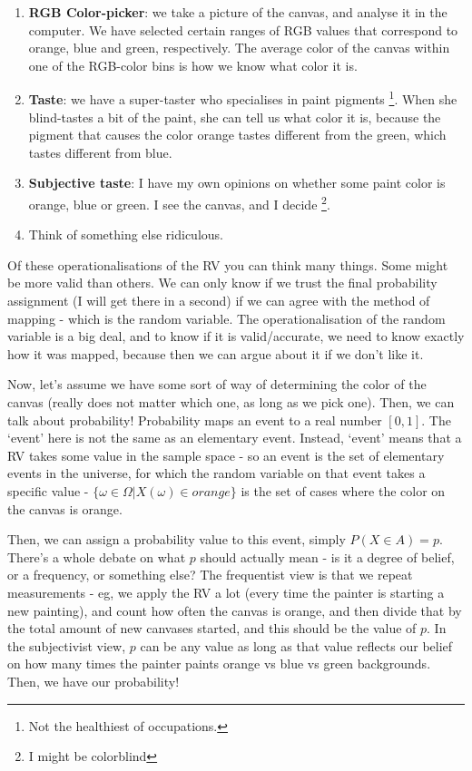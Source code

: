 \begin{enumerate}
\item \textbf{RGB Color-picker}: we take a picture of the canvas, and analyse it in the computer. We have selected certain ranges of RGB values that correspond to orange, blue and green, respectively. The average color of the canvas within one of the RGB-color bins is how we know what color it is.
\item \textbf{Taste}: we have a super-taster who specialises in paint pigments \footnote{Not the healthiest of occupations.}. When she blind-tastes a bit of the paint, she can tell us what color it is, because the pigment that causes the color orange tastes different from the green, which tastes different from blue.
\item \textbf{Subjective taste}: I have my own opinions on whether some paint color is orange, blue or green. I see the canvas, and I decide \footnote{I might be colorblind}.
\item Think of something else ridiculous.
\end{enumerate}

Of these operationalisations of the RV you can think many things. Some might be more valid than others. We can only know if we trust the final probability assignment (I will get there in a second) if we can agree with the method of mapping - which is the random variable. The operationalisation of the random variable is a big deal, and to know if it is valid/accurate, we need to know exactly how it was mapped, because then we can argue about it if we don't like it.

Now, let's assume we have some sort of way of determining the color of the canvas (really does not matter which one, as long as we pick one). Then, we can talk about probability! Probability maps an event to a real number $[0, 1]$. The `event' here is not the same as an elementary event. Instead, `event' means that a RV takes some value in the sample space - so an event is the set of elementary events in the universe, for which the random variable on that event takes a specific value - $\{\omega \in \Omega \vert X(\omega) \in orange\}$ is the set of cases where the color on the canvas is orange.

Then, we can assign a probability value to this event, simply $P(X \in A) = p$. There's a whole debate on what $p$ should actually mean - is it a degree of belief, or a frequency, or something else? The frequentist view is that we repeat measurements - eg, we apply the RV a lot (every time the painter is starting a new painting), and count how often the canvas is orange, and then divide that by the total amount of new canvases started, and this should be the value of $p$.  In the subjectivist view, $p$ can be any value as long as that value reflects our belief on how many times the painter paints orange vs blue vs green backgrounds. Then, we have our probability! 

